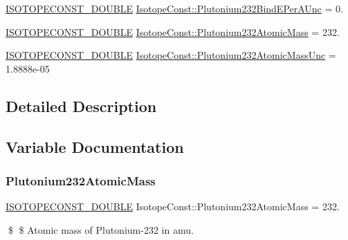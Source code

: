 \begin{DoxyCompactItemize}
\mbox{\hyperlink{group___isotope_const-_macros_ga8f45a7272ce02c0b4c65c44636ed719a}{I\+S\+O\+T\+O\+P\+E\+C\+O\+N\+S\+T\+\_\+\+D\+O\+U\+B\+LE}} \mbox{\hyperlink{group___isotope_const-_plutonium-_pu232_gaa753280eed8451ff37975a36872aae20}{Isotope\+Const\+::\+Plutonium232\+Bind\+E\+Per\+A\+Unc}} = 0.
\item 
\mbox{\hyperlink{group___isotope_const-_macros_ga8f45a7272ce02c0b4c65c44636ed719a}{I\+S\+O\+T\+O\+P\+E\+C\+O\+N\+S\+T\+\_\+\+D\+O\+U\+B\+LE}} \mbox{\hyperlink{group___isotope_const-_plutonium-_pu232_gacbe26a2d69b9247653340d06f473b235}{Isotope\+Const\+::\+Plutonium232\+Atomic\+Mass}} = 232.
\item 
\mbox{\hyperlink{group___isotope_const-_macros_ga8f45a7272ce02c0b4c65c44636ed719a}{I\+S\+O\+T\+O\+P\+E\+C\+O\+N\+S\+T\+\_\+\+D\+O\+U\+B\+LE}} \mbox{\hyperlink{group___isotope_const-_plutonium-_pu232_ga25691993af75112a726cc00038a53b81}{Isotope\+Const\+::\+Plutonium232\+Atomic\+Mass\+Unc}} = 1.\+8888e-\/05
\end{DoxyCompactItemize}


\subsection{Detailed Description}


\subsection{Variable Documentation}
\mbox{\label{group___isotope_const-_plutonium-_pu232_gacbe26a2d69b9247653340d06f473b235}} 
\subsubsection{\texorpdfstring{Plutonium232\+Atomic\+Mass}{Plutonium232AtomicMass}}
{\footnotesize\ttfamily \mbox{\hyperlink{group___isotope_const-_macros_ga8f45a7272ce02c0b4c65c44636ed719a}{I\+S\+O\+T\+O\+P\+E\+C\+O\+N\+S\+T\+\_\+\+D\+O\+U\+B\+LE}} Isotope\+Const\+::\+Plutonium232\+Atomic\+Mass = 232.}

\$ \$ Atomic mass of Plutonium-\/232 in amu. \mbox{\label{group___isotope_const-_plutonium-_pu232_ga25691993af75112a726cc00038a53b81}} 
